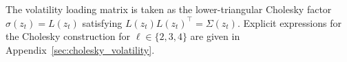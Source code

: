 \begin{description}[
    style=unboxed,
    leftmargin=0pt,
    labelindent=0pt,
    labelsep=0.5em
]
The volatility loading matrix is taken as the lower-triangular Cholesky factor $\sigma(z_t)=L(z_t)$ satisfying $L(z_t)L(z_t)^\top=\Sigma(z_t)$. Explicit expressions for the Cholesky construction for $\ell\in\{2,3,4\}$ are given in Appendix~\ref{sec:cholesky_volatility}.





\end{description}
